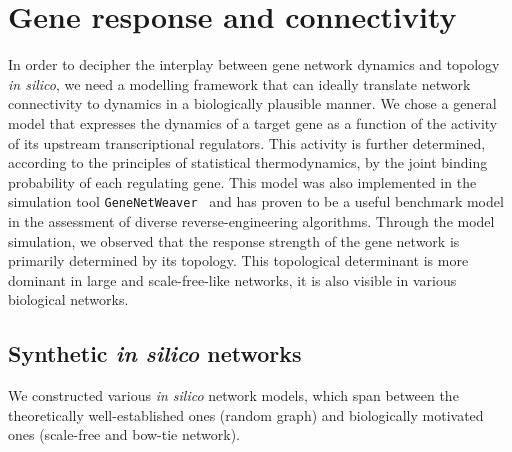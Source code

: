 \section{Gene response and connectivity}
In order to decipher the interplay between gene network 
dynamics and topology \emph{in silico}, 
we need a modelling framework that can ideally translate
network connectivity to dynamics in a biologically plausible
manner. We chose a general model that
expresses the dynamics of a target gene as a function of the
activity of its upstream transcriptional regulators. This
activity is further determined, according to the principles
of statistical thermodynamics, by the joint binding probability
of each regulating gene.
This model was also implemented in the simulation tool
\texttt{GeneNetWeaver}~\citep{Schaffter2011} and has proven
to be a useful benchmark model in the assessment of
diverse reverse-engineering algorithms.
Through the model simulation, 
we observed that the response strength of the gene network
is primarily determined by its topology. This topological
determinant is more dominant in large and scale-free-like 
networks, it is also 
visible in various biological networks.

\subsection{Synthetic \emph{in silico} networks}
We constructed various \emph{in silico}
network models, which span between the theoretically 
well-established ones (random graph) and biologically
motivated ones (scale-free and bow-tie network).

